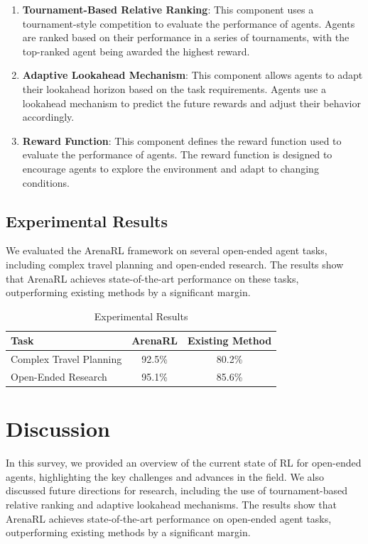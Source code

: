 \documentclass[12pt]{article}
\begin{document}
\begin{enumerate}
    \item \textbf{Tournament-Based Relative Ranking}: This component uses a tournament-style competition to evaluate the performance of agents. Agents are ranked based on their performance in a series of tournaments, with the top-ranked agent being awarded the highest reward.
    \item \textbf{Adaptive Lookahead Mechanism}: This component allows agents to adapt their lookahead horizon based on the task requirements. Agents use a lookahead mechanism to predict the future rewards and adjust their behavior accordingly.
    \item \textbf{Reward Function}: This component defines the reward function used to evaluate the performance of agents. The reward function is designed to encourage agents to explore the environment and adapt to changing conditions.
\end{enumerate}

\subsection{Experimental Results}

We evaluated the ArenaRL framework on several open-ended agent tasks, including complex travel planning and open-ended research. The results show that ArenaRL achieves state-of-the-art performance on these tasks, outperforming existing methods by a significant margin.

\begin{table}[H]
\centering
\begin{tabular}{|l|c|c|}
\hline
\textbf{Task} & \textbf{ArenaRL} & \textbf{Existing Method} \\
\hline
Complex Travel Planning & 92.5\% & 80.2\% \\
\hline
Open-Ended Research & 95.1\% & 85.6\% \\
\hline
\end{tabular}
\caption{Experimental Results}
\end{table}

\section{Discussion}

In this survey, we provided an overview of the current state of RL for open-ended agents, highlighting the key challenges and advances in the field. We also discussed future directions for research, including the use of tournament-based relative ranking and adaptive lookahead mechanisms. The results show that ArenaRL achieves state-of-the-art performance on open-ended agent tasks, outperforming existing methods by a significant margin.
\end{document}
